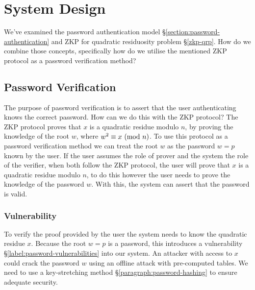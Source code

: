 \section{System Design}
\label{label:protocol-design}

%
%
%
%
%




We've examined the password authentication model \S\ref{section:password-authentication} and ZKP for quadratic residuosity problem \S\ref{zkp-qrp}.
How do we combine those concepts, specifically how do we utilise the mentioned ZKP protocol as a password verification method?

\subsection{Password Verification}
\label{section:zkp-password-verification}
The purpose of password verification is to assert that the user authenticating knows the correct password. 
How can we do this with the ZKP protocol?
The ZKP protocol proves that $x$ is a quadratic residue modulo $n$, by proving the knowledge of the root $w$, where  $w^2 \equiv x \ (\mathrm{mod}\ n)$.
To use this protocol as a password verification method we can treat the root $w$ as the password $w = p$ known by the user.
If the user assumes the role of prover and the system the role of the verifier, when both follow the ZKP protocol, the user will prove that $x$ is a quadratic residue modulo $n$, to do this however the user needs to prove the knowledge of the password $w$. 
With this, the system can assert that the password is valid.


\subsubsection{Vulnerability}
To verify the proof provided by the user the system needs to know the quadratic residue $x$.
Because the root $w = p$ is a password, this introduces a vulnerability \S\ref{label:password-vulnerabilities} into our system.
An attacker with access to $x$ could crack the password $w$ using an offline attack with pre-computed tables.
We need to use a key-stretching method \S\ref{paragraph:password-hashing} to ensure adequate security.






